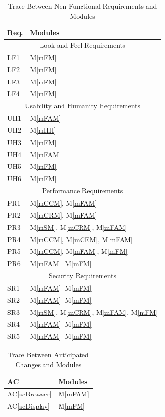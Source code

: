 \documentclass[12pt, titlepage]{article}
\newcommand{\acref}[1]{AC\ref{#1}}
\newcommand{\mref}[1]{M\ref{#1}}
\begin{document}
\begin{table}[H]
\centering
\begin{tabular}{p{} p{}}
\toprule
\textbf{Req.} & \textbf{Modules}\\
\midrule
\multicolumn{2}{c}{Look and Feel Requirements}\\
\midrule
LF1 & \mref{mFM} \\
LF2 & \mref{mFM} \\
LF3 & \mref{mFM} \\
LF4 & \mref{mFM} \\
\midrule
\multicolumn{2}{c}{Usability and Humanity Requirements}\\
\midrule
UH1 & \mref{mFAM} \\
UH2 & \mref{mHH} \\
UH3 & \mref{mFM} \\
UH4 & \mref{mFAM} \\
UH5 & \mref{mFM} \\
UH6 & \mref{mFM} \\
\midrule
\multicolumn{2}{c}{Performance Requirements}\\
\midrule
PR1 & \mref{mCCM}, \mref{mFAM} \\
PR2 & \mref{mCRM}, \mref{mFAM} \\
PR3 & \mref{mSM}, \mref{mCRM}, \mref{mFAM} \\
PR4 & \mref{mCCM}, \mref{mCEM}, \mref{mFAM} \\
PR5 & \mref{mCCM}, \mref{mFAM}, \mref{mFM} \\
PR6 & \mref{mFAM}, \mref{mFM} \\
\midrule
\multicolumn{2}{c}{Security Requirements}\\
\midrule
SR1 & \mref{mFAM}, \mref{mFM} \\
SR2 & \mref{mFAM}, \mref{mFM} \\
SR3 & \mref{mSM}, \mref{mCRM}, \mref{mFAM}, \mref{mFM} \\
SR4 & \mref{mFAM}, \mref{mFM} \\
SR5 & \mref{mFAM}, \mref{mFM} \\
\bottomrule
\end{tabular}
\caption{Trace Between Non Functional Requirements and Modules}
\label{TblNFRT}
\end{table}

\begin{table}[H]
\centering
\begin{tabular}{p{} p{}}
\toprule
\textbf{AC} & \textbf{Modules}\\
\midrule
\acref{acBrowser} & \mref{mFAM}\\
\acref{acDisplay} & \mref{mFM}\\
\bottomrule
\end{tabular}
\caption{Trace Between Anticipated Changes and Modules}
\label{TblACT}
\end{table}
\end{document}
